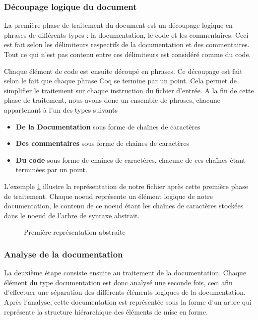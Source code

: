 \documentclass[a4paper, 11pt]{report}
\begin{document}
    \subsubsection{Découpage logique du document}
    La première phase de traitement du document est un découpage logique
    en phrases de différents types : la documentation, le code et les
    commentaires.
    Ceci est fait selon les délimiteurs respectifs de la documentation et
    des commentaires. Tout ce qui n'est pas contenu entre ces délimiteurs
    est considéré comme du code.

    Chaque élément de code est ensuite découpé en phrases.
    Ce découpage est
    fait selon le fait que chaque phrase Coq se termine par un point. Cela
    permet de simplifier le traitement sur chaque instruction du fichier d'entrée.
    A la fin de cette phase de traitement, nous avons donc un ensemble
    de phrases, chacune appartenant à l'un des types suivants
    \begin{itemize}
      \item \textbf{De la Documentation} sous forme de chaînes de caractères
      \item \textbf{Des commentaires} sous forme de chaînes de caractères
      \item \textbf{Du code} sous forme de chaînes de caractères, chacune
        de ces chaînes étant terminées par un point.
    \end{itemize}

    L'exemple \cref{ast1} illustre la représentation de notre fichier après
    cette première phase de traitement. Chaque noeud représente un élément
    logique de notre documentation, le contenu de ce noeud étant les chaînes
    de caractères stockées dans le noeud de l'arbre de syntaxe abstrait.
    \begin{figure}
      \caption{Première représentation abstraite}
      \label{ast1}
    \end{figure}
    \clearpage
    \subsubsection{Analyse de la documentation}
    La deuxième étape consiste ensuite au traitement de la documentation.
    Chaque élément du type documentation est donc analysé une seconde fois,
    ceci afin d'effectuer une séparation des différents éléments logiques
    de la documentation. Après l'analyse, cette documentation est représentée
    sous la forme d'un arbre qui représente la structure hiérarchique des
    éléments de mise en forme.
\end{document}
